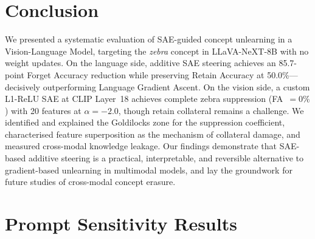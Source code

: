 \documentclass{article}
\begin{document}
\section{Conclusion}
\label{sec:conclusion}

We presented a systematic evaluation of SAE-guided concept unlearning in
a Vision-Language Model, targeting the \textit{zebra} concept in
LLaVA-NeXT-8B with no weight updates. On the language side, additive
SAE steering achieves an 85.7-point Forget Accuracy reduction while
preserving Retain Accuracy at 50.0\%---decisively outperforming Language
Gradient Ascent. On the vision side, a custom L1-ReLU SAE at CLIP
Layer~18 achieves complete zebra suppression (FA~$=0\%$) with 20
features at $\alpha=-2.0$, though retain collateral remains a challenge.
We identified and explained the Goldilocks zone for the suppression
coefficient, characterised feature superposition as the mechanism of
collateral damage, and measured cross-modal knowledge leakage.
Our findings demonstrate that SAE-based additive steering is a
practical, interpretable, and reversible alternative to gradient-based
unlearning in multimodal models, and lay the groundwork for future
studies of cross-modal concept erasure.





\newpage
\appendix
\onecolumn

\section{Prompt Sensitivity Results}
\label{app:prompts}
\end{document}
